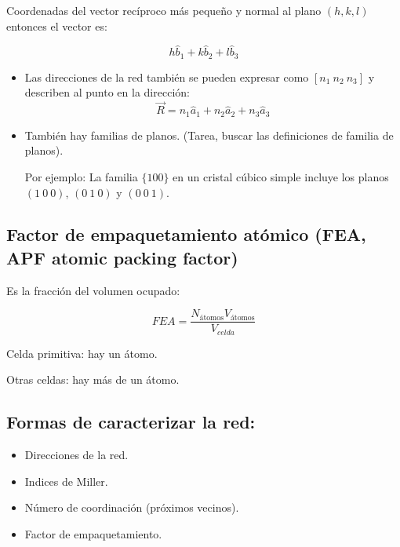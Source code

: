 Coordenadas del vector recíproco más pequeño y normal al plano $(h,k,l)$ entonces el vector es:

$$
h\hat{b}_1+k\hat{b}_2+l\hat{b}_3
$$

\begin{itemize}
    \item Las direcciones de la red también se pueden expresar como $[n_1~n_2~n_3]$ y describen al punto en la dirección:
    $$\vec{R}=n_1\hat{a}_1+n_2\hat{a}_2+n_3\hat{a}_3$$
    \item También hay familias de planos. (Tarea, buscar las definiciones de familia de planos).
    
    Por ejemplo: La familia $\{100\}$ en un cristal cúbico simple incluye los planos $(1~0~0)$, $(0~1~0)$ y $(0~0~1)$.
\end{itemize}

\subsection{Factor de empaquetamiento atómico (FEA, APF atomic packing factor)}

Es la fracción del volumen ocupado:

\begin{equation}
    FEA=\frac{N_{\text{átomos}}V_{\text{átomos}}}{V_{celda}}
\end{equation}

Celda primitiva: hay un átomo.

Otras celdas: hay más de un átomo.

\subsection{Formas de caracterizar la red:}
\begin{itemize}
    \item Direcciones de la red.
    \item Indices de Miller.
    \item Número de coordinación (próximos vecinos).
    \item Factor de empaquetamiento.
\end{itemize}







